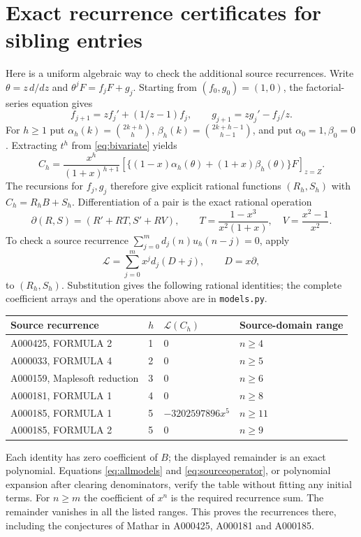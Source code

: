 \documentclass[11pt]{article}
\begin{document}
\section{Exact recurrence certificates for sibling entries}\label{sec:siblings}
Here is a uniform algebraic way to check the additional source recurrences.
Write $\theta=z\,d/dz$ and $\theta^jF=f_jF+g_j$.
Starting from $(f_0,g_0)=(1,0)$, the factorial-series equation gives
\[
 f_{j+1}=zf_j'+(1/z-1)f_j,\qquad
 g_{j+1}=zg_j'-f_j/z.
\]
For $h\geq1$ put
$\alpha_h(k)=\binom{2k+h}{h}$,
$\beta_h(k)=\binom{2k+h-1}{h-1}$, and put
$\alpha_0=1,\beta_0=0$. Extracting $t^h$ from
\eqref{eq:bivariate} yields
\begin{equation}\label{eq:allmodels}
 C_h=\frac{x^h}{(1+x)^{h+1}}
 \left[\{(1-x)\alpha_h(\theta)+(1+x)\beta_h(\theta)\}F\right]_{z=Z}.
\end{equation}
The recursions for $f_j,g_j$ therefore give explicit rational functions
$(R_h,S_h)$ with $C_h=R_hB+S_h$.
Differentiation of a pair is the exact rational operation
\[
 \partial(R,S)=(R'+RT,S'+RV),\qquad
 T=\frac{1-x^3}{x^2(1+x)},\quad V=\frac{x^2-1}{x^2}.
\]
To check a source recurrence $\sum_{j=0}^m d_j(n)u_h(n-j)=0$, apply
\begin{equation}\label{eq:sourceoperator}
 \mathcal L=\sum_{j=0}^m x^jd_j(D+j),\qquad D=x\partial,
\end{equation}
to $(R_h,S_h)$. Substitution gives the following rational identities;
the complete coefficient arrays and the operations above are in
\texttt{models.py}.
\begin{center}\small
\begin{tabular}{llll}
\toprule
Source recurrence & $h$ & $\mathcal L(C_h)$ & Source-domain range\\
\midrule
A000425, FORMULA 2 &1&$0$&$n\geq4$\\
A000033, FORMULA 4 &2&$0$&$n\geq5$\\
A000159, Maplesoft reduction &3&$0$&$n\geq6$\\
A000181, FORMULA 1 &4&$0$&$n\geq8$\\
A000185, FORMULA 1 &5&$-3202597896x^5$&$n\geq11$\\
A000185, FORMULA 2 &5&$0$&$n\geq9$\\
\bottomrule
\end{tabular}\end{center}
Each identity has zero coefficient of $B$; the displayed remainder
is an exact polynomial. Equations \eqref{eq:allmodels} and
\eqref{eq:sourceoperator}, or polynomial expansion after clearing
denominators, verify the table without fitting any initial terms.
For $n\geq m$ the coefficient of $x^n$ is the required recurrence sum.
The remainder vanishes in all the listed ranges. This proves the
recurrences there, including the conjectures of Mathar in A000425,
A000181 and A000185.
\end{document}
